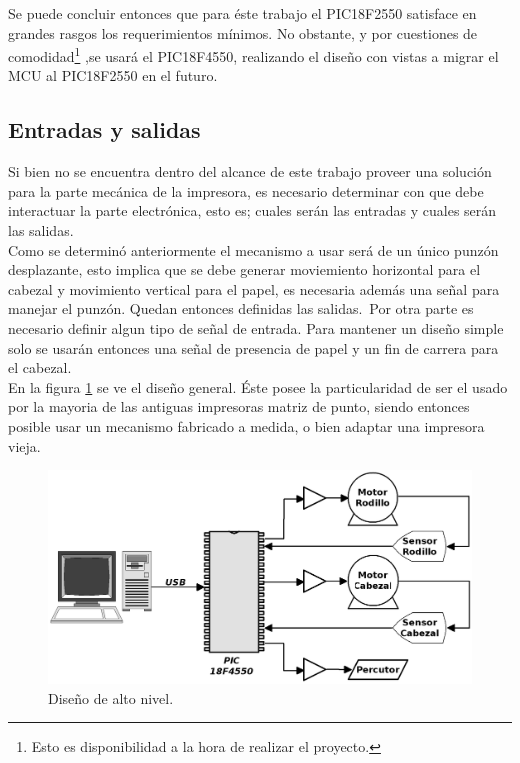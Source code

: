 Se puede concluir entonces que para \'este trabajo el PIC18F2550 satisface en
grandes rasgos los requerimientos m\'inimos. No obstante, y por cuestiones de
comodidad\footnote{Esto es disponibilidad a la hora de realizar el proyecto.}
,se usar\'a el PIC18F4550, realizando el dise\~no con vistas a migrar el MCU
al PIC18F2550 en el futuro.\\

\subsection{Entradas y salidas}
%
Si bien no se encuentra dentro del alcance de este trabajo proveer una
soluci\'on para la parte mec\'anica de la impresora, es necesario determinar
con que debe interactuar la parte electr\'onica, esto es; cuales ser\'an las
entradas y cuales ser\'an las salidas.\\

Como se determin\'o anteriormente el mecanismo a usar ser\'a de un \'unico
punz\'on desplazante, esto implica que se debe generar moviemiento horizontal
para el cabezal y movimiento vertical para el papel, es necesaria adem\'as una
se\~nal para manejar el punz\'on. Quedan entonces definidas las salidas.\
Por otra parte es necesario definir algun tipo de se\~nal de entrada. Para
mantener un dise\~no simple solo se usar\'an entonces una se\~nal de presencia
de papel y un fin de carrera para el cabezal.\\

En la figura \ref{fig:pc_uc_motors} se ve el dise\~no general. \'Este posee la
particularidad de ser el usado por la mayoria de las antiguas impresoras
matriz de punto, siendo entonces posible usar un mecanismo fabricado a medida,
o bien adaptar una impresora vieja.


\begin{figure}[htp]
\centering
\includegraphics[width=13cm]{./img/pc_uc_motors.png}
\caption{Dise\~no de alto nivel.}
\label{fig:pc_uc_motors}
\end{figure}




